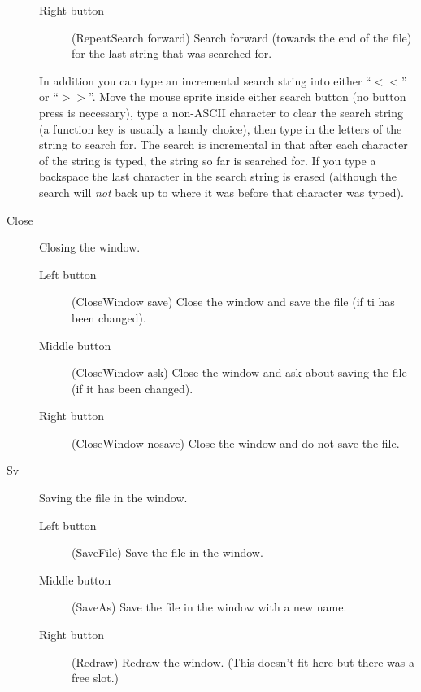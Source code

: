 \begin{description}
\begin{description}
	\item[Right button]  (RepeatSearch forward)
		Search forward (towards the end of the file)
		for the last string that was searched for.

	\end{description}
	
In addition you can type an incremental search string into
either ``$<<$'' or ``$>>$''.
Move the mouse sprite inside either search button
(no button press is necessary),
type a non-ASCII character to clear the search string
(a function key is usually a handy choice),
then type in the letters of the string to search for.
The search is incremental in that after each character of the string
is typed, the string so far is searched for.
If you type a backspace the last character in the search string is
erased (although the search will {\em not} back up to where it was before
that character was typed).

\item[Close] Closing the window.

	\begin{description}

	\item[Left button] (CloseWindow save)
		Close the window and save the file (if ti has been changed).

	\item[Middle button] (CloseWindow ask) Close the window and ask about
		saving the file (if it has been changed).

	\item[Right button] (CloseWindow nosave)
		Close the window and do not save the file.

	\end{description}

\item[Sv] Saving the file in the window.

	\begin{description}

	\item[Left button] (SaveFile) Save the file in the window.

	\item[Middle button] (SaveAs) Save the file in the window
		with a new name.

	\item[Right button] (Redraw) Redraw the window.
		(This doesn't fit here but there was a free slot.)

	\end{description}


\end{description}
